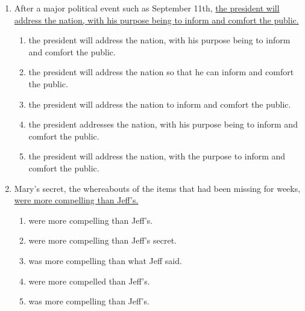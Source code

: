\begin{enumerate}
\begin{spacing}{1.5}
\begin{enumerate}[label=(\Alph*)]
\hrulefill
\end{enumerate}
\end{spacing}

\bigskip
\item After a major political event such as September 11th, \ul{the president will address the nation, with his purpose being to inform and comfort the public.}

\begin{spacing}{1.5}
\begin{enumerate}[label=(\Alph*)]
\item the president will address the nation, with his purpose being to inform and comfort the public.

\hrulefill

\item the president will address the nation so that he can inform and comfort the public.

\hrulefill

\item the president will address the nation to inform and comfort the public.

\hrulefill

\item the president addresses the nation, with his purpose being to inform and comfort the public.

\hrulefill

\item the president will address the nation, with the purpose to inform and comfort the public.

\hrulefill
\end{enumerate}
\end{spacing}

\bigskip
\item Mary's secret, the whereabouts of the items that had been missing for weeks, \ul{were more compelling than Jeff's.}

\begin{spacing}{1.5}
\begin{enumerate}[label=(\Alph*)]
\item were more compelling than Jeff's.

\hrulefill

\item were more compelling than Jeff's secret.

\hrulefill

\item was more compelling than what Jeff said.

\hrulefill

\item were more compelled than Jeff's.

\hrulefill

\item was more compelling than Jeff's.

\hrulefill
\end{enumerate}
\end{spacing}
\end{enumerate}
